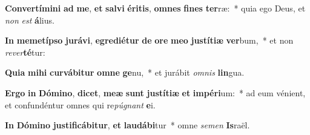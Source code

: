 \item \textbf{Con}\textbf{ver}\textbf{tí}\textbf{mi}\textbf{ni} \textbf{ad} \textbf{me}, \textbf{et} \textbf{sal}\textbf{vi} \textbf{é}\textbf{ri}\textbf{tis}, \textbf{om}\textbf{nes} \textbf{fi}\textbf{nes} \textbf{ter}ræ:~* quia ego Deus, et \textit{non} \textit{est} \textbf{á}lius.
\item \textbf{In} \textbf{me}\textbf{met}\textbf{íp}\textbf{so} \textbf{ju}\textbf{rá}\textbf{vi}, \textbf{e}\textbf{gre}\textbf{di}\textbf{é}\textbf{tur} \textbf{de} \textbf{o}\textbf{re} \textbf{me}\textbf{o} \textbf{jus}\textbf{tí}\textbf{ti}\textbf{æ} \textbf{ver}bum,~* et non \textit{re}\textit{ver}\textbf{té}tur:
\item \textbf{Qui}\textbf{a} \textbf{mi}\textbf{hi} \textbf{cur}\textbf{vá}\textbf{bi}\textbf{tur} \textbf{om}\textbf{ne} \textbf{ge}nu,~* et jurábit \textit{om}\textit{nis} \textbf{lin}gua.
\item \textbf{Er}\textbf{go} \textbf{in} \textbf{Dó}\textbf{mi}\textbf{no}, \textbf{di}\textbf{cet}, \textbf{me}\textbf{æ} \textbf{sunt} \textbf{jus}\textbf{tí}\textbf{ti}\textbf{æ} \textbf{et} \textbf{im}\textbf{pé}\textbf{ri}um:~* ad eum vénient, et confundéntur omnes qui re\textit{pú}\textit{gnant} \textbf{e}i.
\item \textbf{In} \textbf{Dó}\textbf{mi}\textbf{no} \textbf{jus}\textbf{ti}\textbf{fi}\textbf{cá}\textbf{bi}\textbf{tur}, \textbf{et} \textbf{lau}\textbf{dá}\textbf{bi}tur~* omne \textit{se}\textit{men} \textbf{Is}raël.
